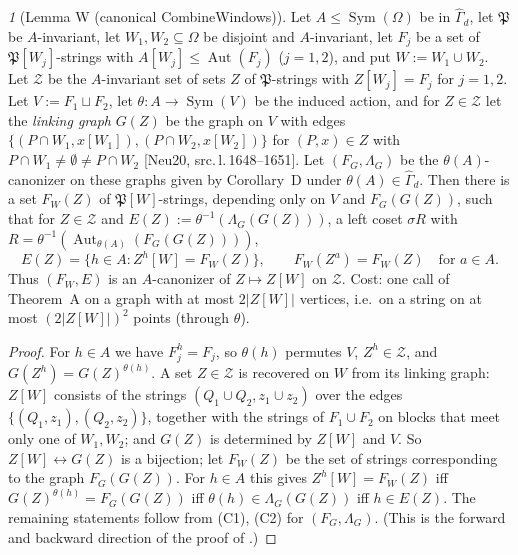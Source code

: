 \documentclass[11pt]{article}
\theoremstyle{plain}
\theoremstyle{definition}
\theoremstyle{remark}
\theoremstyle{named}
\newtheorem*{named}{}
\theoremstyle{namedrm}
\newcommand{\Sym}{\operatorname{Sym}}
\newcommand{\Aut}{\operatorname{Aut}}
\newcommand{\Gd}{\widehat{\Gamma}_d}
\newcommand{\fP}{\mathfrak{P}}
\newcommand{\cZ}{\mathcal{Z}}
\newcommand{\src}[2]{[#1, src.\,l.\,#2]}
\begin{document}
\begin{named}[Lemma W (canonical CombineWindows)]
Let $A\le\Sym(\Omega)$ be in $\Gd$, let $\fP$ be $A$-invariant, let $W_1,W_2\subseteq\Omega$ be disjoint and $A$-invariant, let
$F_j$ be a set of $\fP[W_j]$-strings with $A[W_j]\le\Aut(F_j)$ ($j=1,2$), and put $W:=W_1\cup W_2$. Let $\cZ$ be the
$A$-invariant set of sets $Z$ of $\fP$-strings with $Z[W_j]=F_j$ for $j=1,2$. Let $V:=F_1\sqcup F_2$, let $\theta\colon
A\to\Sym(V)$ be the induced action, and for $Z\in\cZ$ let the \emph{linking graph} $G(Z)$ be the graph on $V$ with
edges $\{(P\cap W_1,x[W_1]),(P\cap W_2,x[W_2])\}$ for $(P,x)\in Z$ with $P\cap W_1\ne\emptyset\ne P\cap W_2$
\src{Neu20}{1648--1651}. Let $(F_G,\Lambda_G)$ be the $\theta(A)$-canonizer on these graphs given by Corollary~D
under $\theta(A)\in\Gd$. Then there is a set $F_W(Z)$ of $\fP[W]$-strings, depending only on $V$ and
$F_G(G(Z))$, such that for $Z\in\cZ$ and $E(Z):=\theta^{-1}(\Lambda_G(G(Z)))$, a left coset $\sigma R$ with
$R=\theta^{-1}(\Aut_{\theta(A)}(F_G(G(Z))))$,
\[ E(Z)=\{h\in A: Z^h[W]=F_W(Z)\},\qquad F_W(Z^a)=F_W(Z)\quad\text{for }a\in A. \]
Thus $(F_W,E)$ is an $A$-canonizer of $Z\mapsto Z[W]$ on $\cZ$. Cost: one call of Theorem~A on a graph with at most
$2|Z[W]|$ vertices, i.e.\ on a string on at most $(2|Z[W]|)^2$ points (through $\theta$).
\end{named}
\begin{proof}
For $h\in A$ we have $F_j^h=F_j$, so $\theta(h)$ permutes $V$, $Z^h\in\cZ$, and $G(Z^h)=G(Z)^{\theta(h)}$. A set $Z\in\cZ$
is recovered on $W$ from its linking graph: $Z[W]$ consists of the strings $(Q_1\cup Q_2,z_1\cup z_2)$ over the edges
$\{(Q_1,z_1),(Q_2,z_2)\}$, together with the strings of $F_1\cup F_2$ on blocks that meet only one of $W_1,W_2$;
and $G(Z)$ is determined by $Z[W]$ and $V$. So $Z[W]\leftrightarrow G(Z)$ is a bijection; let $F_W(Z)$ be the set of
strings corresponding to the graph $F_G(G(Z))$. For $h\in A$ this gives $Z^h[W]=F_W(Z)$ iff $G(Z)^{\theta(h)}=F_G(G(Z))$
iff $\theta(h)\in\Lambda_G(G(Z))$ iff $h\in E(Z)$. The remaining statements follow from (C1), (C2) for
$(F_G,\Lambda_G)$. (This is the forward and backward direction of the proof of \cite[Lemma~4.15]{Neu20}.)
\end{proof}
\end{document}
